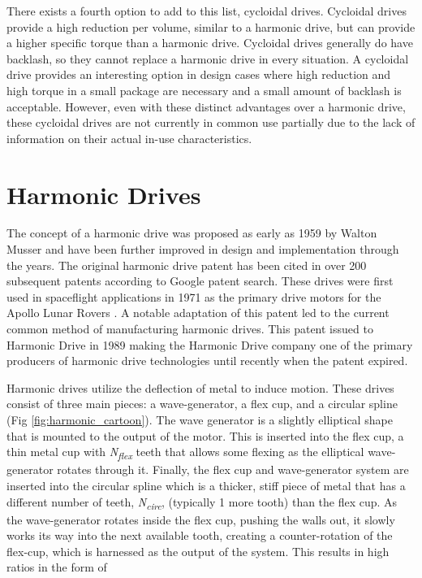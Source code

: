 There exists a fourth option to add to this list, cycloidal drives. 
Cycloidal drives provide a high reduction per volume, similar to a harmonic drive, but can provide a higher specific torque than a harmonic drive. 
Cycloidal drives generally do have backlash, so they cannot replace a harmonic drive in every situation. A cycloidal drive provides an interesting option in design cases where high reduction and high torque in a small package are necessary and a small amount of backlash is acceptable. 
However, even with these distinct advantages over a harmonic drive, these cycloidal drives are not currently in common use partially due to the lack of information on their actual in-use characteristics. 

\section{Harmonic Drives} \label{intro:harmonic}

The concept of a harmonic drive was proposed as early as 1959 by Walton Musser \cite{ref:harmonic_original} and have been further improved in design and implementation through the years. The original harmonic drive patent has been cited in over 200 subsequent patents according to Google patent search. These drives were first used in spaceflight applications in 1971 as the primary drive motors for the Apollo Lunar Rovers \cite{ref:harmonic_apollo}. A notable adaptation of this patent led to the current common method of manufacturing harmonic drives. This patent issued to Harmonic Drive in 1989 \cite{ref:harmonic_drive_co} making the Harmonic Drive company one of the primary producers of harmonic drive technologies until recently when the patent expired. 

Harmonic drives utilize the deflection of metal to induce motion. These drives consist of three main pieces: a wave-generator, a flex cup, and a circular spline (Fig \ref{fig:harmonic_cartoon}). The wave generator is a slightly elliptical shape that is mounted to the output of the motor. This is inserted into the flex cup, a thin metal cup with \textit{N\textsubscript{flex}} teeth that allows some flexing as the elliptical wave-generator rotates through it. Finally, the flex cup and wave-generator system are inserted into the circular spline which is a thicker, stiff piece of metal that has a different number of teeth, \textit{N\textsubscript{circ}}, (typically 1 more tooth) than the flex cup. As the wave-generator rotates inside the flex cup, pushing the walls out, it slowly works its way into the next available tooth, creating a counter-rotation of the flex-cup, which is harnessed as the output of the system. This results in high ratios in the form of 

